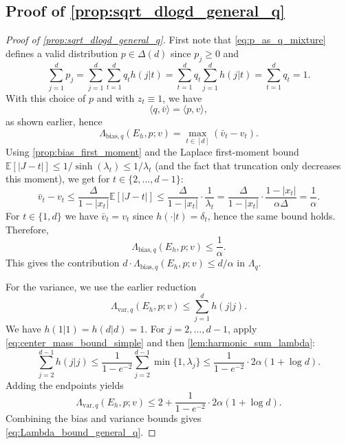 \documentclass{article}
\theoremstyle{plain}
\theoremstyle{definition}
\theoremstyle{plain}
\newcommand{\E}{\mathbb E}
\begin{document}
\subsection{Proof of \texorpdfstring{\cref{prop:sqrt_dlogd_general_q}}{Proposition (A sqrt(d log d) guarantee)}}
\label{proof:prop:sqrt_dlogd_general_q}
\begin{proof}[Proof of \cref{prop:sqrt_dlogd_general_q}]
    First note that \eqref{eq:p_as_q_mixture} defines a valid distribution $p\in\Delta(d)$ since $p_j\ge 0$ and
    \[
        \sum_{j=1}^d p_j = \sum_{j=1}^d \sum_{t=1}^d q_t h(j|t) = \sum_{t=1}^d q_t\sum_{j=1}^d h(j|t)=\sum_{t=1}^d q_t = 1.
    \]
    With this choice of $p$ and with $z_t\equiv 1$, we have
    \[
        \langle q,\bar v\rangle = \langle p,v\rangle,
    \]
    as shown earlier, hence
    \[
        \Lambda_{\mathrm{bias},q}(E_h,p;v)=\max_{t\in[d]}(\bar v_t-v_t).
    \]
    Using \cref{prop:bias_first_moment} and the Laplace first-moment bound
    $\E[|J-t|]\le 1/\sinh(\lambda_t)\le 1/\lambda_t$ (and the fact that truncation only decreases this moment),
    we get for $t\in\{2,\ldots,d-1\}$:
    \[
        \bar v_t-v_t
        \le \frac{\Delta}{1-|x_t|}\E[|J-t|]
        \le \frac{\Delta}{1 - |x_t|}\cdot\frac{1}{\lambda_t}
        =
        \frac{\Delta}{1 - |x_t|}\cdot\frac{1 - |x_t|}{\alpha\Delta}
        = \frac{1}{\alpha}.
    \]
    For $t\in\{1,d\}$ we have $\bar v_t=v_t$ since $h(\cdot|t)=\delta_t$, hence the same bound holds.
    Therefore,
    \[
        \Lambda_{\mathrm{bias},q}(E_h,p;v)\le \frac{1}{\alpha}.
    \]
    This gives the contribution $d\cdot \Lambda_{\mathrm{bias},q}(E_h,p;v)\le d/\alpha$ in $\Lambda_q$.

    For the variance, we use the earlier reduction
    \[
        \Lambda_{\text{var}, q}(E_h, p; v)\le \sum_{j=1}^d h(j|j).
    \]
    We have $h(1|1)=h(d|d)=1$.
    For $j=2,\ldots,d-1$, apply \eqref{eq:center_mass_bound_simple} and then \cref{lem:harmonic_sum_lambda}:
    \[
        \sum_{j=2}^{d-1} h(j|j)
        \le
        \frac{1}{1-e^{-2}}\sum_{j=2}^{d-1}\min\{1,\lambda_j\}
        \le
        \frac{1}{1-e^{-2}}\cdot 2\alpha(1+\log d).
    \]
    Adding the endpoints yields
    \[
        \Lambda_{\text{var}, q}(E_h, p; v)
        \le
        2 + \frac{1}{1-e^{-2}}\cdot 2\alpha(1+\log d).
    \]
    Combining the bias and variance bounds gives \eqref{eq:Lambda_bound_general_q}.
\end{proof}
\end{document}
